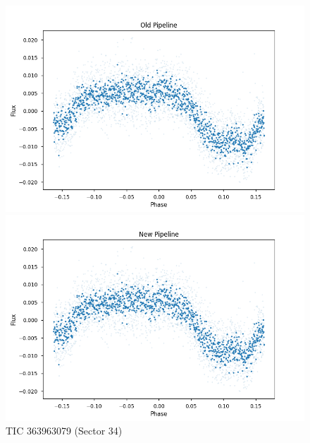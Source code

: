\documentclass{article}
\begin{document}
\begin{figure}[h!]
    \centering
    \begin{minipage}{0.45\textwidth}
        \centering
        \includegraphics[width=\textwidth]{./figures/3_old.png}
    \end{minipage}%
    \hfill
    \begin{minipage}{0.45\textwidth}
        \centering
        \includegraphics[width=\textwidth]{./figures/3_new.png}
    \end{minipage}
    \caption{TIC 363963079 (Sector 34)}
\end{figure}
\end{document}

